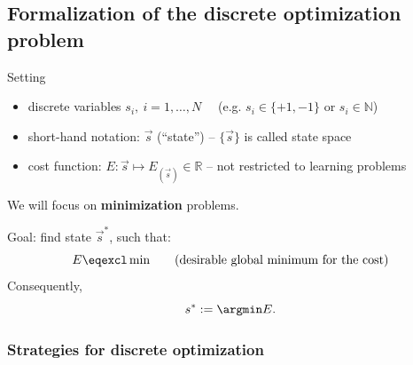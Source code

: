 
\subsection{Formalization of the discrete optimization problem}

\begin{frame}{\subsecname}

\begin{block}{Setting} 
\begin{itemize}
 \item discrete variables $s_i, \ i = 1, \ldots, N\quad$ (e.g. $s_i \in \{+1, -1\}$   or $s_i \in \mathbb N$) 
 \item \indent short-hand notation: $\vec{s}$ (``state'') -- { $\{\vec{s}\}$ is called state space }
 \item {cost function:} $E: \vec{s} \mapsto E_{(\vec{s})} \in \mathbb{R}$ -- { not restricted to learning problems}
\end{itemize}
\end{block}

We will focus on \textbf{minimization} problems.

\begin{block}{Goal: find state $\vec{s}^*$, such that:} 
\begin{equation*}
	E \eqexcl \min \qquad (\text{desirable global minimum for the cost})
\end{equation*}
Consequently,
\begin{equation*}
	s^* := \argmin E.
\end{equation*}
\end{block}
\end{frame}

\subsubsection{Strategies for discrete optimization}

